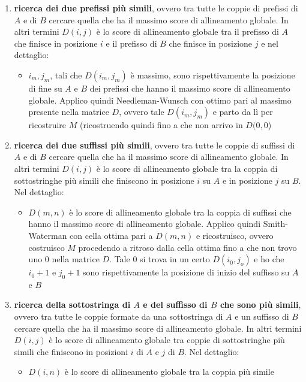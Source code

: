 \documentclass[a4paper,12pt, oneside]{book}
\begin{document}
\begin{enumerate}
  \item \textbf{ricerca dei due prefissi più simili}, ovvero tra tutte le coppie
  di prefissi di $A$ e di $B$ cercare quella che ha il massimo score di
  allineamento globale. In altri termini $D(i,j)$ è lo score di
  allineamento globale tra il prefisso di $A$ che finisce in posizione $i$ e il
  prefisso di $B$ che finisce in posizione $j$ e nel dettaglio: 
  \begin{itemize}
    \item $i_m,j_m$, tali che $D(i_m,j_m)$ è massimo, sono rispettivamente la
    posizione di fine su $A$ e $B$ dei prefissi che hanno il massimo score di
    allineamento globale. Applico quindi Needleman-Wunsch con ottimo pari al
    massimo presente nella matrice $D$, ovvero tale $D(i_m,j_m)$ e parto da lì
    per ricostruire $M$ (ricostruendo quindi fino a che non arrivo in $D(0,0$)
  \end{itemize}
  \item \textbf{ricerca dei due suffissi più simili}, ovvero tra tutte le coppie
  di suffissi di $A$ e di $B$ cercare quella che ha il massimo score di
  allineamento globale. In altri termini $D(i,j)$ è lo score di
  allineamento globale tra la coppia di sottostringhe più simili che finiscono
  in posizione $i$ su $A$ e in posizione $j$ su $B$. Nel dettaglio:
   \begin{itemize}
    \item $D(m,n)$ è lo score di allineamento globale tra la coppia di suffissi
    che hanno il massimo score di allineamento globale. Applico quindi
    Smith-Waterman con cella ottima pari a $D(m,n)$ e ricostruisco, ovvero
    costruisco $M$ procedendo a ritroso dalla cella ottima fino a che non trovo
    uno 0 nella matrice $D$. Tale 0 si trova in un certo $D(i_0,j_o)$ e ho che
    $i_0+1$ e $j_0+1$ sono rispettivamente la posizione di inizio del suffisso
    su $A$ e $B$
  \end{itemize}
  \item \textbf{ricerca della sottostringa di $A$ e del suffisso di $B$ che sono
    più simili}, ovvero tra tutte le coppie formate da una sottostringa di $A$ e
  un suffisso di $B$ cercare quella che ha il massimo score di allineamento
  globale. In altri termini $D(i,j)$ è lo score di
  allineamento globale tra coppie di sottostringhe più simili che finiscono in
  posizioni $i$ di $A$ e $j$ di $B$. Nel dettaglio: 
  \begin{itemize}
    \item $D(i,n)$ è lo score di allineamento globale tra la coppia più simile

\end{itemize}
\end{enumerate}
\end{document}
